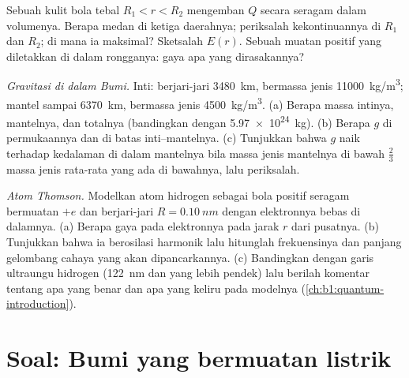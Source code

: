 \begin{exercise}[$\star\star\star$]\label{exo:b1:electrostatics-gauss:10}
Sebuah kulit bola tebal $R_1 < r < R_2$ mengemban $Q$ secara seragam dalam
volumenya. Berapa medan di ketiga daerahnya; periksalah kekontinuannya di $R_1$ dan
$R_2$; di mana ia maksimal? Sketsalah $E(r)$. Sebuah muatan positif yang diletakkan
di dalam rongganya: gaya apa yang dirasakannya?
\end{exercise}

\begin{exercise}[$\star\star\star$]\label{exo:b1:electrostatics-gauss:11}
\emph{Gravitasi di dalam Bumi.} Inti: berjari-jari \qty{3480}{km}, bermassa jenis
\qty{11000}{kg/m^3}; mantel sampai \qty{6370}{km}, bermassa jenis \qty{4500}{kg/m^3}.
(a) Berapa massa intinya, mantelnya, dan totalnya (bandingkan dengan \qty{5.97e24}{kg}).
(b) Berapa $g$ di permukaannya dan di batas inti--mantelnya. (c) Tunjukkan bahwa
$g$ naik terhadap kedalaman di dalam mantelnya bila massa jenis mantelnya di bawah
$\tfrac23$ massa jenis rata-rata yang ada di bawahnya, lalu periksalah.
\end{exercise}

\begin{exercise}[$\star\star\star$]\label{exo:b1:electrostatics-gauss:12}
\emph{Atom Thomson.} Modelkan atom hidrogen sebagai bola positif
seragam bermuatan $+e$ dan berjari-jari $R = \qty{0.10}{nm}$ dengan elektronnya
bebas di dalamnya. (a) Berapa gaya pada elektronnya pada jarak $r$ dari pusatnya.
(b) Tunjukkan bahwa ia berosilasi harmonik lalu hitunglah frekuensinya dan
panjang gelombang cahaya yang akan dipancarkannya. (c) Bandingkan dengan
garis ultraungu hidrogen (\qty{122}{nm} dan yang lebih pendek) lalu berilah komentar tentang
apa yang benar dan apa yang keliru pada modelnya (\cref{ch:b1:quantum-introduction}).
\end{exercise}

\section{Soal: Bumi yang bermuatan listrik}

